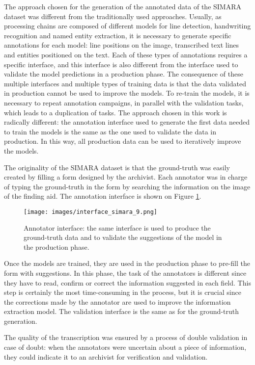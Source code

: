 \documentclass[runningheads]{llncs}
\begin{document}
The approach chosen for the generation of the annotated data of the SIMARA dataset was different from the traditionally used approaches. Usually, as processing chains are composed of different models for line detection, handwriting recognition and named entity extraction, it is necessary to generate specific annotations for each model: line positions on the image, transcribed text lines and entities positioned on the text. Each of these types of annotations requires a specific interface, and this interface is also different from the interface used to validate the model predictions in a production phase. The consequence of these multiple interfaces and multiple types of training data is that the data validated in production cannot be used to improve the models. To re-train the models, it is necessary to repeat annotation campaigns, in parallel with the validation tasks, which leads to a duplication of tasks. The approach chosen in this work is radically different: the annotation interface used to generate the first data needed to train the models is the same as the one used to validate the data in production. In this way, all production data can be used to iteratively improve the models.

The originality of the SIMARA dataset is that the ground-truth was easily created by filling a form designed by the archivist. Each annotator was in charge of typing the ground-truth in the form by searching the information on the image of the finding aid. The annotation interface is shown on Figure \ref{fig:interf_simara_9}.

\begin{figure}[ht]
    \centering
    \texttt{[image: images/interface\_simara\_9.png]}
    \caption{Annotator interface: the same interface is used to produce the ground-truth data and to validate the suggestions of the model in the production phase.}
    \label{fig:interf_simara_9}
\end{figure}

Once the models are trained, they are used in the production phase to pre-fill the form with suggestions. In this phase, the task of the annotators is different since they have to read, confirm or correct the information suggested in each field. This step is certainly the most time-consuming in the process, but it is crucial since the corrections made by the annotator are used to improve the information extraction model. The validation interface is the same as for the ground-truth generation.

The quality of the transcription was ensured by a process of double validation in case of doubt: when the annotators were uncertain about a piece of information, they could indicate it to an archivist for verification and validation. 
\end{document}
